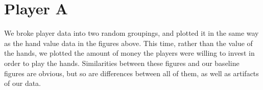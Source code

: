 \documentclass[12pt]{article}
\begin{document}
\newpage

\section*{Player A}

We broke player data into two random groupings, and plotted it in the same way as the hand
value data in the figures above. This time, rather than the value of the hands, we plotted the
amount of money the players were willing to invest in order to play the hands. Similarities
between these figures and our baseline figures are obvious, but so are differences between all
of them, as well as artifacts of our data.

\begin{figure}[ht!]
\end{figure}
\end{document}
